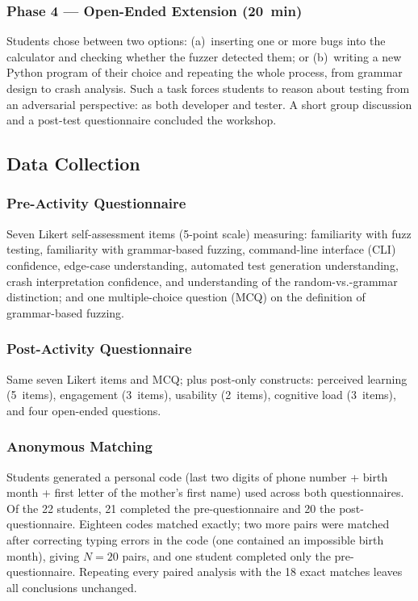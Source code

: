 \documentclass[conference]{IEEEtran}
\begin{document}
\subsubsection{Phase 4 --- Open-Ended Extension (20~min)}
Students chose between two options: (a)~inserting one or more bugs into the calculator and checking whether the fuzzer detected them; or (b)~writing a new Python program of their choice and repeating the whole process, from grammar design to crash analysis.
Such a task forces students to reason about testing from an adversarial perspective: as both developer and tester.
A short group discussion and a post-test questionnaire concluded the workshop.

\subsection{Data Collection}

\subsubsection{Pre-Activity Questionnaire}
Seven Likert self-assessment items (5-point scale) measuring: familiarity with fuzz testing, familiarity with grammar-based fuzzing, command-line interface (CLI) confidence, edge-case understanding, automated test generation understanding, crash interpretation confidence, and understanding of the random-vs.-grammar distinction; and one multiple-choice question (MCQ) on the definition of grammar-based fuzzing.

\subsubsection{Post-Activity Questionnaire}
Same seven Likert items and MCQ; plus post-only constructs: perceived learning (5~items), engagement (3~items), usability (2~items), cognitive load (3~items), and four open-ended questions.

\subsubsection{Anonymous Matching}
Students generated a personal code (last two digits of phone number + birth month + first letter of the mother's first name) used across both questionnaires.
Of the 22 students, 21 completed the pre-questionnaire and 20 the post-questionnaire.
Eighteen codes matched exactly; two more pairs were matched after correcting typing errors in the code (one contained an impossible birth month), giving $N = 20$ pairs, and one student completed only the pre-questionnaire.
Repeating every paired analysis with the 18 exact matches leaves all conclusions unchanged.
\end{document}
